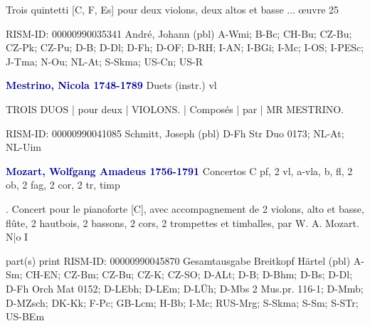 \documentclass[twocolumn]{book}
\begin{document}
\newline \begin{itshape}Trois quintetti [C, F, Es] pour deux violons, deux altos et basse ... œuvre 25\end{itshape} 
\newline RISM-ID: 00000990035341
\newline André, Johann  (pbl)
\newline A-Wmi; B-Bc; CH-Bu; CZ-Bu; CZ-Pk; CZ-Pu; D-B; D-Dl; D-Fh; D-OF; D-RH; I-AN; I-BGi; I-Mc; I-OS; I-PESc; J-Tma; N-Ou; NL-At; S-Skma; US-Cn; US-R
\newline \par \vspace{7pt} \textcolor{darkblue}{\textbf{Mestrino, Nicola  1748-1789}}
\newline Duets (instr.)    
 vl
\newline \begin{itshape}TROIS DUOS | pour deux | VIOLONS. | Composés | par | MR MESTRINO.\end{itshape} 
\newline RISM-ID: 00000990041085
\newline Schmitt, Joseph  (pbl)
\newline D-Fh  Str Duo 0173; NL-At; NL-Uim
\newline \par \vspace{7pt} \textcolor{darkblue}{\textbf{Mozart, Wolfgang Amadeus  1756-1791}}
\newline Concertos  C  
\newline pf, 2 vl, a-vla, b, fl, 2 ob, 2 fag, 2 cor, 2 tr, timp
\newline \begin{itshape}. Concert pour le pianoforte [C], avec accompagnement de 2 violons, alto et basse, flûte, 2 hautbois, 2 bassons, 2 cors, 2 trompettes et timballes, par W. A. Mozart. N|o I\end{itshape} 
\newline \textcolor{darkblue}{}  part(s)  
\newline print
\newline RISM-ID: 00000990045870
\newline Gesamtausgabe
\newline Breitkopf  Härtel  (pbl)
\newline A-Sm; CH-EN; CZ-Bm; CZ-Bu; CZ-K; CZ-SO; D-ALt; D-B; D-Bhm; D-Bs; D-Dl; D-Fh  Orch Mat 0152; D-LEbh; D-LEm; D-LÜh; D-Mbs  2 Mus.pr. 116-1; D-Mmb; D-MZsch; DK-Kk; F-Pc; GB-Lcm; H-Bb; I-Mc; RUS-Mrg; S-Skma; S-Sm; S-STr; US-BEm
\end{document}
